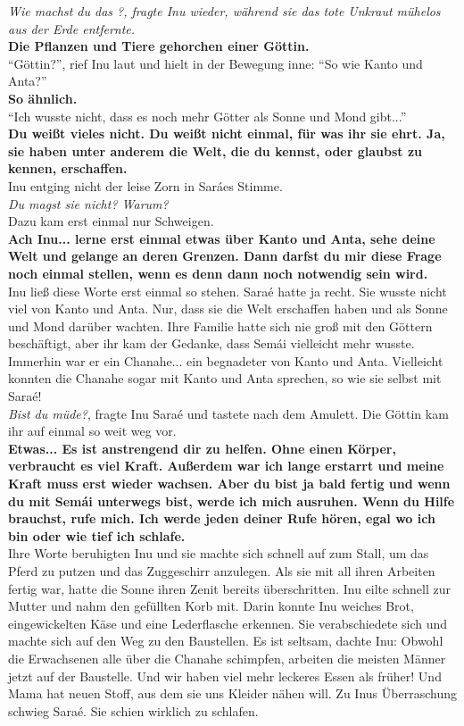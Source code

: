 \textit{Wie machst du das ?, fragte Inu wieder, während sie das tote Unkraut mühelos aus der Erde 
entfernte. }\\
\textbf{Die Pflanzen und Tiere gehorchen einer Göttin.}\\
``Göttin?'', rief Inu laut und hielt in der Bewegung inne: ``So wie Kanto und Anta?''\\
\textbf{So ähnlich.}\\
``Ich wusste nicht, dass es noch mehr Götter als Sonne und Mond gibt...''\\
\textbf{Du weißt vieles nicht. Du weißt nicht einmal, für was ihr sie ehrt. Ja, sie haben unter 
anderem die Welt, die du kennst, oder glaubst zu kennen, erschaffen.}\\
Inu entging nicht der leise Zorn in Saráes Stimme.\\
\textit{Du magst sie nicht? Warum?}\\
Dazu kam erst einmal nur Schweigen. \\
\textbf{Ach Inu... lerne erst einmal etwas über Kanto und Anta, sehe deine Welt und gelange an 
deren Grenzen. Dann darfst du mir diese Frage noch einmal stellen, wenn es denn dann noch notwendig 
sein wird.}\\
Inu ließ diese Worte erst einmal so stehen. Saraé hatte ja recht. Sie wusste nicht viel von Kanto 
und Anta. Nur, dass sie die Welt erschaffen haben und als Sonne und Mond darüber wachten. Ihre 
Familie hatte sich nie groß mit den Göttern beschäftigt, aber ihr kam der Gedanke, dass Semái 
vielleicht mehr wusste. Immerhin war er ein Chanahe... ein begnadeter von Kanto und Anta. 
Vielleicht konnten die Chanahe sogar mit Kanto und Anta sprechen, so wie sie selbst mit Saraé!\\
\textit{Bist du müde?}, fragte Inu Saraé und tastete nach dem Amulett. Die Göttin kam ihr auf 
einmal so weit weg vor. \\
\textbf{Etwas... Es ist anstrengend dir zu helfen. Ohne einen Körper, verbraucht es viel Kraft. 
Außerdem war ich lange erstarrt und meine Kraft muss erst wieder wachsen. Aber du bist ja bald 
fertig und wenn du mit Semái unterwegs bist, werde ich mich ausruhen. Wenn du Hilfe brauchst, rufe 
mich. Ich werde jeden deiner Rufe hören, egal wo ich bin oder wie tief ich schlafe.}\\
Ihre Worte beruhigten Inu und sie machte sich schnell auf zum Stall, um das Pferd zu putzen und das 
Zuggeschirr anzulegen. Als sie mit all ihren Arbeiten fertig war, hatte die Sonne ihren Zenit 
bereits überschritten. Inu eilte schnell zur Mutter und nahm den gefüllten Korb mit. Darin konnte 
Inu weiches Brot, eingewickelten Käse und eine Lederflasche erkennen. Sie verabschiedete sich und 
machte sich auf den Weg zu den Baustellen. Es ist seltsam, dachte Inu: Obwohl die Erwachsenen alle 
über die Chanahe schimpfen, arbeiten die meisten Männer jetzt auf der Baustelle. Und wir haben viel 
mehr leckeres Essen als früher! Und Mama hat neuen Stoff, aus dem sie uns Kleider nähen will.
Zu Inus Überraschung schwieg Saraé. Sie schien wirklich zu schlafen. \\

